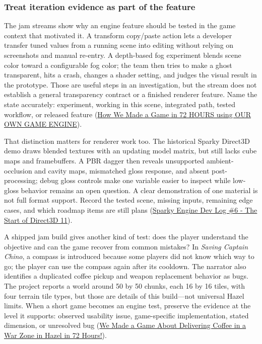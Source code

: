 \subsubsection{Treat iteration evidence as part of the feature}\label{06-engine-ii-ch040-treat-iteration-evidence-as-part-of-the-feature}

\hypertarget{06-engine-ii-ch040-treat-iteration-evidence-as-part-of-the-feature}{}

The jam streams show why an engine feature should be tested in the game context that motivated it. A transform copy/paste action lets a developer transfer tuned values from a running scene into editing without relying on screenshots and manual re-entry. A depth-based fog experiment blends scene color toward a configurable fog color; the team then tries to make a ghost transparent, hits a crash, changes a shader setting, and judges the visual result in the prototype. Those are useful steps in an investigation, but the stream does not establish a general transparency contract or a finished renderer feature. Name the state accurately: experiment, working in this scene, integrated path, tested workflow, or released feature (\href{https://www.youtube.com/watch?v=tQ_pjZDfm-0&t=1m10s}{How We Made a Game in 72 HOURS using OUR OWN GAME ENGINE}).

That distinction matters for renderer work too. The historical Sparky Direct3D demo draws blended textures with an updating model matrix, but still lacks cube maps and framebuffers. A PBR dagger then reveals unsupported ambient-occlusion and cavity maps, mismatched gloss response, and absent post-processing; debug gloss controls make one variable easier to inspect while low-gloss behavior remains an open question. A clear demonstration of one material is not full format support. Record the tested scene, missing inputs, remaining edge cases, and which roadmap items are still plans (\href{https://www.youtube.com/watch?v=AsNE-eGmGxs&t=7m34s}{Sparky Engine Dev Log \#6 - The Start of Direct3D 11}).

A shipped jam build gives another kind of test: does the player understand the objective and can the game recover from common mistakes? In \emph{Saving Captain Chino}, a compass is introduced because some players did not know which way to go; the player can use the compass again after its cooldown. The narrator also identifies a duplicated coffee pickup and weapon replacement behavior as bugs. The project reports a world around 50 by 50 chunks, each 16 by 16 tiles, with four terrain tile types, but those are details of this build---not universal Hazel limits. When a short game becomes an engine test, preserve the evidence at the level it supports: observed usability issue, game-specific implementation, stated dimension, or unresolved bug (\href{https://www.youtube.com/watch?v=ahrdtYwBLTk&t=2m10s}{We Made a Game About Delivering Coffee in a War Zone in Hazel in 72 Hours!}).

